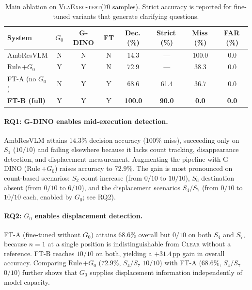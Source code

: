 \documentclass{article}
\newcommand{\datasettest}{\textsc{VlaExec-test}}
\begin{document}
\begin{table}[h]
\centering
\small
\caption{Main ablation on \datasettest ($70$ samples).
Strict accuracy is reported for fine-tuned variants that generate
clarifying questions.}
\label{tab:main}
\begin{tabular}{lccccccc}
\toprule
System & $G_0$ & G-DINO & FT & Dec.\,(\%) & Strict\,(\%) & Miss\,(\%) & FAR\,(\%) \\
\midrule
AmbResVLM            & N & N & N & 14.3 & --- & 100.0 & 0.0 \\
Rule\,$+G_0$         & Y & Y & N & 72.9 & --- & 38.3  & 0.0 \\
FT-A (no $G_0$)      & N & Y & Y & 68.6 & 61.4 & 36.7 & 0.0 \\
\textbf{FT-B (full)} & Y & Y & Y & \textbf{100.0} & \textbf{90.0} & \textbf{0.0} & \textbf{0.0} \\
\bottomrule
\end{tabular}
\end{table}

\paragraph{RQ1: G-DINO enables mid-execution detection.}
AmbResVLM attains $14.3\%$ decision accuracy ($100\%$ miss),
succeeding only on $S_1$ ($10/10$) and failing elsewhere because it
lacks count tracking, disappearance detection, and displacement
measurement. Augmenting the pipeline with G-DINO (Rule\,$+G_0$) raises
accuracy to $72.9\%$. The gain is most pronounced on count-based
scenarios: $S_2$ count increase (from $0/10$ to $10/10$),
$S_6$ destination absent (from $0/10$ to $6/10$), and the displacement
scenarios $S_4$/$S_7$ (from $0/10$ to $10/10$ each, enabled by $G_0$;
see RQ2).

\paragraph{RQ2: $G_0$ enables displacement detection.}
FT-A (fine-tuned without $G_0$) attains $68.6\%$ overall but $0/10$ on
both $S_4$ and $S_7$, because $n=1$ at a single position is
indistinguishable from \textsc{Clear} without a reference. FT-B reaches
$10/10$ on both, yielding a $+31.4$\,pp gain in overall accuracy.
Comparing Rule\,$+G_0$ ($72.9\%$, $S_4$/$S_7$ $10/10$) with FT-A
($68.6\%$, $S_4$/$S_7$ $0/10$) further shows that $G_0$ supplies
displacement information independently of model capacity.
\end{document}
